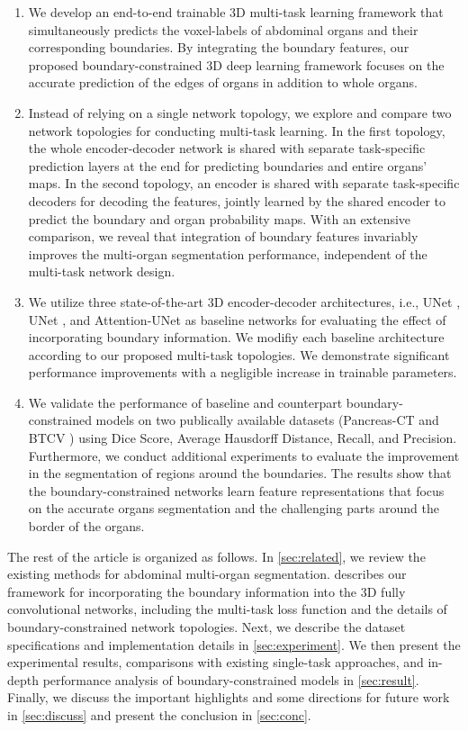 \documentclass[final,5p,times,twocolumn]{elsarticle}
\begin{document}
\begin{enumerate}[label=(\roman*)]
\item We develop an end-to-end trainable 3D multi-task learning framework that simultaneously predicts the voxel-labels of abdominal organs and their corresponding boundaries. By integrating the boundary features, our proposed boundary-constrained 3D deep learning framework focuses on the accurate prediction of the edges of organs in addition to whole organs.
\item Instead of relying on a single network topology, we explore and compare two network topologies for conducting multi-task learning. In the first topology, the whole encoder-decoder network is shared with separate task-specific prediction layers at the end for predicting boundaries and entire organs' maps. In the second topology, an encoder is shared with separate task-specific decoders for decoding the features, jointly learned by the shared encoder to predict the boundary and organ probability maps. With an extensive comparison, we reveal that integration of boundary features invariably improves the multi-organ segmentation performance, independent of the multi-task network design.
\item We utilize three state-of-the-art 3D encoder-decoder architectures, i.e., UNet \cite{cciccek20163d}, UNet \cite{zhou2019unet++}, and Attention-UNet \cite{schlemper2019attention} as baseline networks for evaluating the effect of incorporating boundary information. We modifiy each baseline architecture according to our proposed multi-task topologies. We demonstrate significant performance improvements with a negligible increase in trainable parameters.
\item We validate the performance of baseline and counterpart boundary-constrained models on two publically available datasets (Pancreas-CT \cite{Roth2016} and BTCV \cite{landmanbvc}) using Dice Score, Average Hausdorff Distance, Recall, and Precision. Furthermore, we conduct additional experiments to evaluate the improvement in the segmentation of regions around the boundaries. The results show that the boundary-constrained networks learn feature representations that focus on the accurate organs segmentation and the challenging parts around the border of the organs. 
\end{enumerate}
The rest of the article is organized as follows. In \autoref{sec:related}, we review the existing methods for abdominal multi-organ segmentation.  describes our framework for incorporating the boundary information into the 3D fully convolutional networks, including the multi-task loss function and the details of boundary-constrained network topologies. Next, we describe the dataset specifications and implementation details in \autoref{sec:experiment}. We then present the experimental results, comparisons with existing single-task approaches, and in-depth performance analysis of boundary-constrained models in \autoref{sec:result}. Finally, we discuss the important highlights and some directions for future work in \autoref{sec:discuss} and present the conclusion in \autoref{sec:conc}. 
\end{document}
